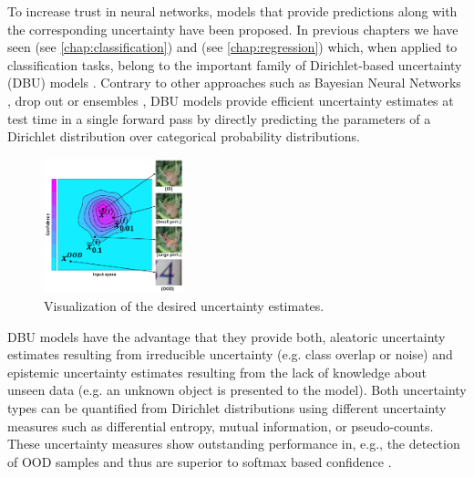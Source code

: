 To increase trust in neural networks, models that provide predictions along with the corresponding uncertainty have been proposed. In previous chapters we have seen \PostNetacro{} (see \cref{chap:classification}) and \NatPNacro{} (see \cref{chap:regression}) which, when applied to classification tasks, belong to the important family of Dirichlet-based uncertainty (DBU) models  \citep{malini2018, distribution-distillation, sensoy2018, reverse-kl, charpentier2020, graph_uncertainty, max_gap_id_ood, multifaceted_uncertainty, uncertainty-generative-classifier}. 
Contrary to other approaches such as Bayesian Neural Networks \citep{bayesian-networks, osawa2019, simple-baseline-uncertainty}, drop out \citep{dropout} or ensembles \citep{ensembles}, DBU models provide efficient uncertainty estimates at test time in a single forward pass by directly predicting the parameters of a Dirichlet distribution over categorical probability distributions.
%
\begin{figure}[t]
\centering
\includegraphics[width=0.36\textwidth]{sections/008_icml2021/eval/uncertainty_diagram.png}
\caption{Visualization of the desired uncertainty estimates. 
}
\label{fig:uncertainty_attack_diagram}
\end{figure}
%
DBU models have the advantage that they provide both, aleatoric uncertainty estimates resulting from irreducible uncertainty (e.g. class overlap or noise) and epistemic uncertainty estimates resulting from the lack of knowledge about unseen data (e.g. an unknown object is presented to the model). Both uncertainty types can be quantified from Dirichlet distributions using different uncertainty measures such as differential entropy, mutual information, or pseudo-counts. These uncertainty measures show outstanding performance in, e.g., the detection of OOD samples and thus are superior to softmax based confidence \citep{malini2018, reverse-kl, charpentier2020}.

